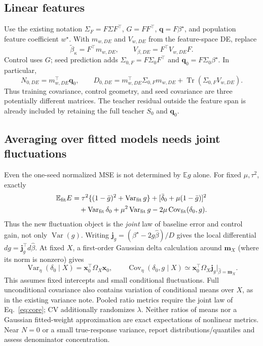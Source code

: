 \documentclass[11pt]{article}
\newcommand{\E}{\mathbb E}
\newcommand{\Var}{\operatorname{Var}}
\newcommand{\Cov}{\operatorname{Cov}}
\newcommand{\Tr}{\operatorname{Tr}}
\newcommand{\bstar}{{\beta^{\star}}}
\newcommand{\bhat}{\hat{\beta}}
\newcommand{\x}{\mathbf{x}}
\begin{document}
\subsection{Linear features}
Use the existing notation $\Sigma_F=F\Sigma F^\top$, $G=FF^\top$,
$\bm q=F\bstar$, and population feature coefficient $w^\star$.
With $m_{w,DE}$ and $V_{w,DE}$ from the feature-space DE, replace
\[
 \tilde\beta_\kappa=F^\top m_{w,DE},\qquad V_{\beta,DE}=F^\top V_{w,DE} F.
\]
Control uses $G$; seed prediction adds $\Sigma_{0,F}=F\Sigma_0 F^\top$ and
$\bm q_0=F\Sigma_0\bstar$. In particular,
\[
 N_{0,DE}=m_{w,DE}^\top\bm q_0,\qquad
 D_{0,DE}=m_{w,DE}^\top \Sigma_{0,F}m_{w,DE}+\Tr(\Sigma_{0,F}V_{w,DE}).
\]
Thus training covariance, control geometry, and seed covariance are three
potentially different matrices. The teacher residual outside the feature
span is already included by retaining the full teacher $S_0$ and $\bm q_0$.

\subsection{Averaging over fitted models needs joint fluctuations}
Even the one-seed normalized MSE is not determined by $\E g$ alone.
For fixed $\mu,\tau^2$, exactly
\begin{align}
 \E_{\rm fit}E
 &=\tau^2\{(1-\bar g)^2+\Var_{\rm fit}g\}
   +[\bar\delta_0+\mu(1-\bar g)]^2\\
 &\quad+\Var_{\rm fit}\delta_0+\mu^2\Var_{\rm fit}g
       -2\mu\Cov_{\rm fit}(\delta_0,g).
\end{align}
Thus the new fluctuation object is the \emph{joint} law of baseline error and
control gain, not only $\Var(g)$. Writing
$\bm j_g=(\bstar-2g\bhat)/D$ gives the local differential $dg=\bm j_g^\top d\bhat$.
At fixed $X$, a first-order Gaussian delta calculation around
$\bm m_X$ (where its norm is nonzero) gives
\[
 \Var_\eta(\delta_0\mid X)=\x_0^\top\Omega_X\x_0,
 \qquad
 \Cov_\eta(\delta_0,g\mid X)\simeq
 \x_0^\top\Omega_X\bm j_g\big|_{\bhat=\bm m_X}.
\]
This assumes fixed intercepts and small conditional fluctuations. Full
unconditional covariance also contains variation of conditional means over
$X$, as in the existing variance note. Pooled ratio metrics require the joint
law of Eq.~\eqref{eq:core}; CV additionally randomizes $\lambda$.
Neither ratios of means nor a Gaussian fitted-weight approximation are exact
expectations of nonlinear metrics. Near $N=0$ or a small true-response
variance, report distributions/quantiles and assess denominator concentration.
\end{document}
